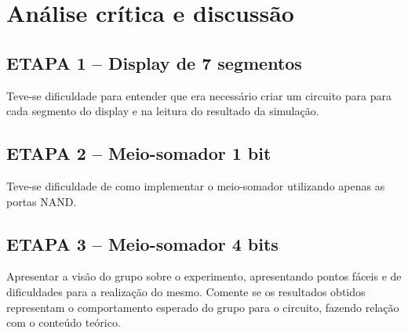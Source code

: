 \chapter{Análise crítica e discussão}
	\section{ETAPA 1 – Display de 7 segmentos}
		Teve-se dificuldade para entender que era necessário criar um circuito
		para para cada segmento do display e na leitura do resultado da simulação.
	\section{ETAPA 2 – Meio-somador 1 bit}
		Teve-se dificuldade de como implementar o meio-somador utilizando apenas as portas NAND.
	\section{ETAPA 3 – Meio-somador 4 bits}


Apresentar  a  visão do  grupo  sobre  o  experimento,  apresentando  pontos  fáceis  e
de  dificuldades  para  a  realização  do  mesmo.  Comente  se  os  resultados  obtidos
representam  o  comportamento  esperado   do   grupo   para  o   circuito,   fazendo
relação com o conteúdo teórico.
